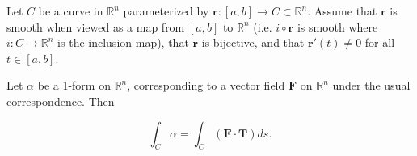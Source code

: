\begin{proposition}\label{ra.425b.final.5}

Let \(C\) be a curve in \(\mathbb{R}^n\) parameterized by \(\boldsymbol{r}: [a,b] \to C \subset \mathbb{R}^n\). Assume that \(\boldsymbol{r}\) is smooth when viewed as a map from \([a,b]\) to \(\mathbb{R}^n\) (i.e. \(i \circ \boldsymbol{r}\) is smooth where \(i: C \to \mathbb{R}^n\) is the inclusion map), that \(\boldsymbol{r}\) is bijective, and that \(\boldsymbol{r}'(t) \neq 0\) for all \(t \in [a,b]\). 

Let \(\alpha\) be a 1-form on \(\mathbb{R}^n\), corresponding to a vector field \(\boldsymbol{F}\) on \(\mathbb{R}^n\) under the usual correspondence. Then

\[
\int_C \alpha = \int_C (\boldsymbol{F} \cdot \boldsymbol{T}) ds.
\]

\end{proposition}

